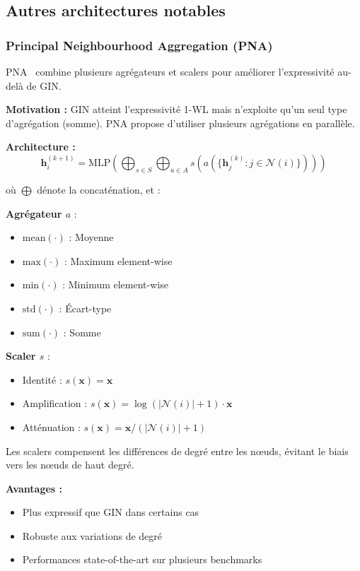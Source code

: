 \subsection{Autres architectures notables}

\subsubsection{Principal Neighbourhood Aggregation (PNA)}

PNA~\cite{Corso2020} combine plusieurs agrégateurs et scalers pour améliorer l'expressivité au-delà de GIN.

\textbf{Motivation :}
GIN atteint l'expressivité 1-WL mais n'exploite qu'un seul type d'agrégation (somme). PNA propose d'utiliser plusieurs agrégations en parallèle.

\textbf{Architecture :}
\[
\mathbf{h}_i^{(k+1)} = \text{MLP}\left(\bigoplus_{s \in S} \bigoplus_{a \in A} s\left(a\left(\{\mathbf{h}_j^{(k)} : j \in \mathcal{N}(i)\}\right)\right)\right)
\]

où $\bigoplus$ dénote la concaténation, et :

\textbf{Agrégateur $a$} :
\begin{itemize}
    \item $\text{mean}(\cdot)$ : Moyenne
    \item $\text{max}(\cdot)$ : Maximum element-wise
    \item $\text{min}(\cdot)$ : Minimum element-wise
    \item $\text{std}(\cdot)$ : Écart-type
    \item $\text{sum}(\cdot)$ : Somme
\end{itemize}

\textbf{Scaler $s$} :
\begin{itemize}
    \item Identité : $s(\mathbf{x}) = \mathbf{x}$
    \item Amplification : $s(\mathbf{x}) = \log(|\mathcal{N}(i)| + 1) \cdot \mathbf{x}$
    \item Atténuation : $s(\mathbf{x}) = \mathbf{x} / (|\mathcal{N}(i)| + 1)$
\end{itemize}

Les scalers compensent les différences de degré entre les nœuds, évitant le biais vers les nœuds de haut degré.

\textbf{Avantages :}
\begin{itemize}
    \item Plus expressif que GIN dans certains cas
    \item Robuste aux variations de degré
    \item Performances state-of-the-art sur plusieurs benchmarks
\end{itemize}

